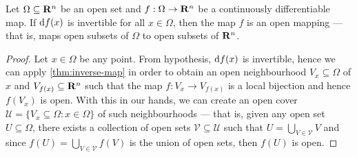 \begin{theorem}
  \label{thm:open-map-theorem}
  Let \(\Omega \subseteq \mathbf{R}^n\) be an open set and \(f: \Omega \to \mathbf{R}^{n}\) be a continuously
  differentiable map. If \(\mathrm{d} f(x)\) is invertible for all \(x \in \Omega\), then
  the map \(f\) is an open mapping --- that is, maps open subsets of \(\Omega\) to
  open subsets of \(\mathbf{R}^n\).
\end{theorem}

\begin{proof}
  Let \(x \in \Omega\) be any point. From hypothesis, \(\mathrm{d} f(x)\) is invertible,
  hence we can apply \cref{thm:inverse-map} in order to obtain an open
  neighbourhood \(V_{x} \subseteq \Omega\) of \(x\) and \(V_{f(x)} \subseteq \mathbf{R}^n\) such that the map
  \(f: V_{x} \to V_{f(x)}\) is a local bijection and hence \(f(V_x)\) is
  open. With this in our hands, we can create an open cover \(\mathcal U =
  \{V_{x} \subseteq \Omega : x \in \Omega\}\) of such neighbourhoods --- that is, given any open set
  \(U \subseteq \Omega\), there exists a collection of open sets \(\mathcal V \subseteq \mathcal U\)
  such that \(U = \bigcup_{V \in \mathcal V} V\) and since \(f(U) = \bigcup_{V \in \mathcal V}
  f(V)\) is the union of open sets, then \(f(U)\) is open.
\end{proof}

